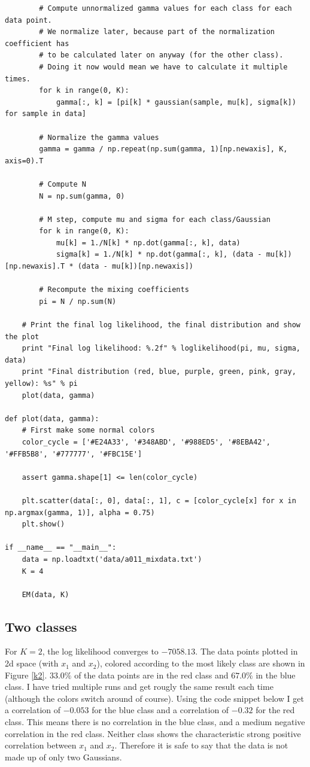 \documentclass[paper=a4, fontsize=10pt]{scrartcl} %
\numberwithin{equation}{section} %
\numberwithin{figure}{section} %
\numberwithin{table}{section} %
\begin{document}
\begin{verbatim}
		# Compute unnormalized gamma values for each class for each data point.
		# We normalize later, because part of the normalization coefficient has
		# to be calculated later on anyway (for the other class).
		# Doing it now would mean we have to calculate it multiple times.
		for k in range(0, K):
			gamma[:, k] = [pi[k] * gaussian(sample, mu[k], sigma[k]) for sample in data]

		# Normalize the gamma values
		gamma = gamma / np.repeat(np.sum(gamma, 1)[np.newaxis], K, axis=0).T

		# Compute N
		N = np.sum(gamma, 0)

		# M step, compute mu and sigma for each class/Gaussian
		for k in range(0, K):
			mu[k] = 1./N[k] * np.dot(gamma[:, k], data)
			sigma[k] = 1./N[k] * np.dot(gamma[:, k], (data - mu[k])[np.newaxis].T * (data - mu[k])[np.newaxis])

		# Recompute the mixing coefficients
		pi = N / np.sum(N)

	# Print the final log likelihood, the final distribution and show the plot
	print "Final log likelihood: %.2f" % loglikelihood(pi, mu, sigma, data)
	print "Final distribution (red, blue, purple, green, pink, gray, yellow): %s" % pi
	plot(data, gamma)

def plot(data, gamma):
	# First make some normal colors
	color_cycle = ['#E24A33', '#348ABD', '#988ED5', '#8EBA42', '#FFB5B8', '#777777', '#FBC15E']

	assert gamma.shape[1] <= len(color_cycle)

	plt.scatter(data[:, 0], data[:, 1], c = [color_cycle[x] for x in np.argmax(gamma, 1)], alpha = 0.75)
	plt.show()

if __name__ == "__main__":
	data = np.loadtxt('data/a011_mixdata.txt')
	K = 4

	EM(data, K)
\end{verbatim}

\subsection{Two classes}
For $K = 2$, the log likelihood converges to $-7058.13$. The data points plotted in 2d space (with $x_1$ and $x_2$), colored according to the most likely class are shown in Figure \ref{k2}. $33.0\%$ of the data points are in the red class and $67.0\%$ in the blue class. I have tried multiple runs and get rougly the same result each time (although the colors switch around of course). Using the code snippet below I get a correlation of $-0.053$ for the blue class and a correlation of $-0.32$ for the red class. This means there is no correlation in the blue class, and a medium negative correlation in the red class. Neither class shows the characteristic strong positive correlation between $x_1$ and $x_2$. Therefore it is safe to say that the data is not made up of only two Gaussians.
\end{document}
